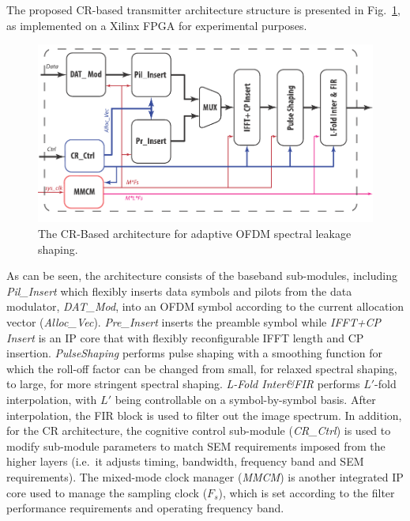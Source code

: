 The proposed CR-based transmitter architecture structure is presented in Fig.~\ref{fig:Struc}, as implemented on a Xilinx FPGA for experimental purposes.
\begin{figure}[t]
    \centerline{\includegraphics [width=0.9\columnwidth] {Figures/CRTx_shaping} }
	\vspace{-2mm}
    \caption{The CR-Based architecture for adaptive OFDM spectral leakage shaping.}
    \label{fig:Struc}
\end{figure}
As can be seen, the architecture consists of the baseband sub-modules, including %
\emph{Pil\_Insert} which flexibly inserts data symbols and pilots from the data modulator, \emph{DAT\_Mod}, into an OFDM symbol according to the current allocation vector (\emph{Alloc\_Vec}).
\emph{Pre\_Insert} inserts the preamble symbol while \emph{IFFT+CP Insert} is an IP core that with flexibly reconfigurable IFFT length and CP insertion.
\emph{PulseShaping} performs pulse shaping with a smoothing function for which the roll-off factor can be changed from small, for relaxed spectral shaping, to large, for more stringent spectral shaping.
\emph{L-Fold Inter\&FIR} performs $L'$-fold interpolation, with $L'$ being controllable on a symbol-by-symbol basis. After interpolation, the FIR block is used to filter out the image spectrum.
In addition, for the CR architecture, the cognitive control sub-module (\emph{CR\_Ctrl}) is used to modify sub-module parameters to match SEM requirements imposed from the higher layers (i.e.\ it adjusts timing, bandwidth, frequency band and SEM requirements).
The mixed-mode clock manager (\emph{MMCM}) is another integrated IP core used to manage the sampling clock ($\mathit{F_s}$), which is set according to the filter performance requirements and operating frequency band.

